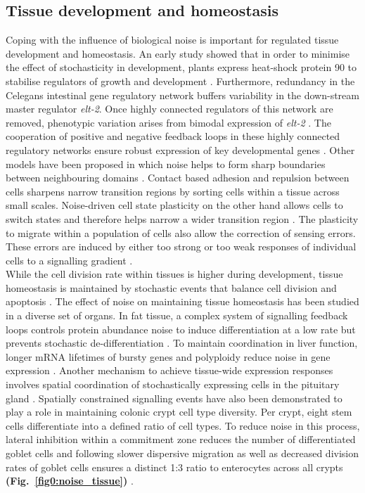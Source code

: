 \subsection{Tissue development and homeostasis}

Coping with the influence of biological noise is important for regulated tissue development and homeostasis. 
An early study showed that in order to minimise the effect of stochasticity in development, plants express heat-shock protein 90 to stabilise regulators of growth and development \citep{Queitsch2002}. 
Furthermore, redundancy in the \Gls{Celegans} intestinal gene regulatory network buffers variability in the down-stream master regulator \textit{elt-2}. 
Once highly connected regulators of this network are removed, phenotypic variation arises from bimodal expression of \textit{elt-2} \citep{Raj2010}. 
The cooperation of positive and negative feedback loops in these highly connected regulatory networks ensure robust expression of key developmental genes \citep{Ji2013}. 
Other models have been proposed in which noise helps to form sharp boundaries between neighbouring domains \citep{Zhang2012}. 
Contact based adhesion and repulsion between cells sharpens narrow transition regions by sorting cells within a tissue across small scales. Noise-driven cell state plasticity on the other hand allows cells to switch states and therefore helps narrow a wider transition region \citep{Wang2017}. 
The plasticity to migrate within a population of cells also allow the correction of sensing errors. These errors are induced by either too strong or too weak responses of individual cells to a signalling gradient \citep{Camley2017}.\\

While the cell division rate within tissues is higher during development, tissue homeostasis is maintained by stochastic events that balance cell division and apoptosis \citep{Ranft2010}. 
The effect of noise on maintaining tissue homeostasis has been studied in a diverse set of organs. 
In fat tissue, a complex system of signalling feedback loops controls protein abundance noise to induce differentiation at a low rate but prevents stochastic de-differentiation \citep{Ahrends2014}. 
To maintain coordination in liver function, longer mRNA lifetimes of bursty genes and polyploidy reduce noise in gene expression \citep{BaharHalpern2015}. 
Another mechanism to achieve tissue-wide expression responses involves spatial coordination of stochastically expressing cells in the pituitary gland \citep{Featherstone2016}. 
Spatially constrained signalling events have also been demonstrated to play a role in maintaining colonic crypt cell type diversity. 
Per crypt, eight stem cells differentiate into a defined ratio of cell types. To reduce noise in this process, lateral inhibition within a commitment zone reduces the number of differentiated goblet cells and following slower dispersive migration as well as decreased division rates of goblet cells ensures a distinct 1:3 ratio to enterocytes across all crypts \textbf{(Fig.~\ref{fig0:noise_tissue})} \citep{Toth2017}.

